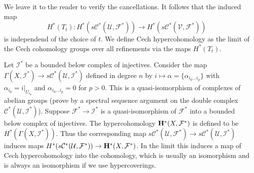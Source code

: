 We leave it to the reader to verify the cancellations.
It follows that the induced map
$$
H^*(T_t) :
H^*(s{\mathcal C}^*({\mathcal U},{\mathcal F}^*)) \to
H^*(s{\mathcal C}^*({\mathcal V},{\mathcal F}^*))
$$
is independend of the choice of $t$. We define
Cech hypercohomology as the limit of the Cech cohomology groups
over all refinements via the maps $H^*(T_t)$.

\medskip\noindent
Let ${\mathcal I}^*$ be a bounded below complex of injectives. Consider
the map $\Gamma(X, {\mathcal I}^*) \to
s{\mathcal C}^*({\mathcal U}, {\mathcal I}^*)$ defined in degree $n$ by
$i \mapsto \alpha = \{\alpha_{i_0\ldots i_p}\}$ with
$\alpha_{i_0} = i|_{U_{i_0}}$ and $\alpha_{i_0\ldots i_p} = 0$
for $p>0$. This is a quasi-isomorphism of complexes of abelian groups
(prove by a spectral sequence argument on the double complex
${\mathcal C}^*({\mathcal U}, {\mathcal I}^*)$).
Suppose ${\mathcal F}^* \to {\mathcal I}^*$ is a quasi-isomorphism
of ${\mathcal F}^*$ into a bounded below complex of injectives. 
The hypercohomology ${\bf H}^*(X,{\mathcal F}^*)$ is defined 
to be $H^*(\Gamma(X, {\mathcal I}^*))$. Thus
the corresponding map $s{\mathcal C}^*({\mathcal U}, {\mathcal F}^*) \to 
s{\mathcal C}^*({\mathcal U}, {\mathcal I}^*)$ induces maps
$H^*(s{\mathcal C}^*({\mathcal U}, {\mathcal F}^*)) \to {\bf H}^*(X,{\mathcal F}^*)$.
In the limit this induces a map of Cech hypercohomology into
the cohomology, which is usually an isomorphism and is always
an isomorphism if we use hypercoverings.

